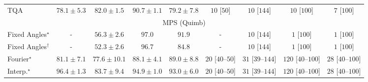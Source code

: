 \begin{tabular}{l|cccc|cccc|}
TQA & {\cellcolor[HTML]{8C7DBA}} \color[HTML]{F1F1F1} $78.1\pm 5.3$ & {\cellcolor[HTML]{8B60AC}} \color[HTML]{F1F1F1} $82.0\pm 1.5$ & {\cellcolor[HTML]{821982}} \color[HTML]{F1F1F1} $90.7\pm 1.1$ & {\cellcolor[HTML]{8C75B6}} \color[HTML]{F1F1F1} $79.2\pm 7.8$ & {\cellcolor[HTML]{FFF6F2}} \color[HTML]{000000} $10$ [$50$] & {\cellcolor[HTML]{FFF6F2}} \color[HTML]{000000} $10$ [$144$] & {\cellcolor[HTML]{FFF6F2}} \color[HTML]{000000} $10$ [$100$] & {\cellcolor[HTML]{FFF6F2}} \color[HTML]{000000} $7$ [$100$] \\
\cline{1-9}
\multicolumn{9}{c}{\rule{0pt}{8pt}MPS (Quimb)} \\
\midrule
Fixed Angles$^\star$ & {\cellcolor[HTML]{000000}} \color[HTML]{F1F1F1} {\cellcolor{white}} \color{black} - & {\cellcolor[HTML]{FFF9C9}} \color[HTML]{000000} $56.3\pm 2.6$ & {\cellcolor[HTML]{692606}} \color[HTML]{F1F1F1} $97.0$ & {\cellcolor[HTML]{983404}} \color[HTML]{F1F1F1} $91.9$ & {\cellcolor[HTML]{000000}} \color[HTML]{F1F1F1} {\cellcolor{white}} \color{black} - & {\cellcolor[HTML]{FFF6F2}} \color[HTML]{000000} $10$ [$144$] & {\cellcolor[HTML]{FFF7F3}} \color[HTML]{000000} $1$ [$100$] & {\cellcolor[HTML]{FFF7F3}} \color[HTML]{000000} $1$ [$100$] \\
Fixed Angles$^\dagger$ & {\cellcolor[HTML]{000000}} \color[HTML]{F1F1F1} {\cellcolor{white}} \color{black} - & {\cellcolor[HTML]{FFFFE5}} \color[HTML]{000000} $52.3\pm 2.6$ & {\cellcolor[HTML]{6B2606}} \color[HTML]{F1F1F1} $96.7$ & {\cellcolor[HTML]{D35406}} \color[HTML]{F1F1F1} $84.8$ & {\cellcolor[HTML]{000000}} \color[HTML]{F1F1F1} {\cellcolor{white}} \color{black} - & {\cellcolor[HTML]{FFF6F2}} \color[HTML]{000000} $10$ [$144$] & {\cellcolor[HTML]{FFF7F3}} \color[HTML]{000000} $1$ [$100$] & {\cellcolor[HTML]{FFF7F3}} \color[HTML]{000000} $1$ [$100$] \\
Fourier$^\star$ & {\cellcolor[HTML]{E86C12}} \color[HTML]{F1F1F1} $81.1\pm 7.1$ & {\cellcolor[HTML]{F5851F}} \color[HTML]{F1F1F1} $77.6\pm 10.1$ & {\cellcolor[HTML]{B94303}} \color[HTML]{F1F1F1} $88.1\pm 4.1$ & {\cellcolor[HTML]{B13F03}} \color[HTML]{F1F1F1} $89.0\pm 8.8$ & {\cellcolor[HTML]{FFF3EF}} \color[HTML]{000000} $20$ [$40$--$50$] & {\cellcolor[HTML]{FEF1ED}} \color[HTML]{000000} $31$ [$39$--$144$] & {\cellcolor[HTML]{FDDAD7}} \color[HTML]{000000} $120$ [$40$--$100$] & {\cellcolor[HTML]{FEF1ED}} \color[HTML]{000000} $28$ [$40$--$100$] \\
Interp.$^\star$ & {\cellcolor[HTML]{6E2706}} \color[HTML]{F1F1F1} $96.4\pm 1.3$ & {\cellcolor[HTML]{D95B09}} \color[HTML]{F1F1F1} $83.7\pm 9.4$ & {\cellcolor[HTML]{7C2C05}} \color[HTML]{F1F1F1} $94.9\pm 1.0$ & {\cellcolor[HTML]{8C3004}} \color[HTML]{F1F1F1} $93.0\pm 6.0$ & {\cellcolor[HTML]{FFF3EF}} \color[HTML]{000000} $20$ [$40$--$50$] & {\cellcolor[HTML]{FEF1ED}} \color[HTML]{000000} $31$ [$39$--$144$] & {\cellcolor[HTML]{FDDAD7}} \color[HTML]{000000} $120$ [$40$--$100$] & {\cellcolor[HTML]{FEF1ED}} \color[HTML]{000000} $28$ [$40$--$100$] \\

\end{tabular}
